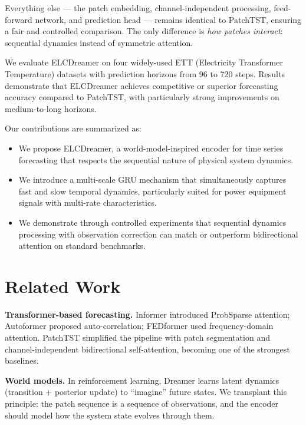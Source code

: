 \documentclass[conference]{IEEEtran}
\begin{document}
Everything else --- the patch embedding, channel-independent processing, feed-forward network, and prediction head --- remains identical to PatchTST, ensuring a fair and controlled comparison. The only difference is \emph{how patches interact}: sequential dynamics instead of symmetric attention.

We evaluate ELCDreamer on four widely-used ETT (Electricity Transformer Temperature) datasets \cite{b_informer} with prediction horizons from 96 to 720 steps. Results demonstrate that ELCDreamer achieves competitive or superior forecasting accuracy compared to PatchTST, with particularly strong improvements on medium-to-long horizons.

Our contributions are summarized as:
\begin{itemize}
    \item We propose ELCDreamer, a world-model-inspired encoder for time series forecasting that respects the sequential nature of physical system dynamics.
    \item We introduce a multi-scale GRU mechanism that simultaneously captures fast and slow temporal dynamics, particularly suited for power equipment signals with multi-rate characteristics.
    \item We demonstrate through controlled experiments that sequential dynamics processing with observation correction can match or outperform bidirectional attention on standard benchmarks.
\end{itemize}

\section{Related Work}

\textbf{Transformer-based forecasting.} Informer \cite{b_informer} introduced ProbSparse attention; Autoformer \cite{b_autoformer} proposed auto-correlation; FEDformer \cite{b_fedformer} used frequency-domain attention. PatchTST \cite{b_patchtst} simplified the pipeline with patch segmentation and channel-independent bidirectional self-attention, becoming one of the strongest baselines.

\textbf{World models.} In reinforcement learning, Dreamer \cite{b_dreamer} learns latent dynamics (transition + posterior update) to ``imagine'' future states. We transplant this principle: the patch sequence is a sequence of observations, and the encoder should model how the system state evolves through them.
\end{document}
